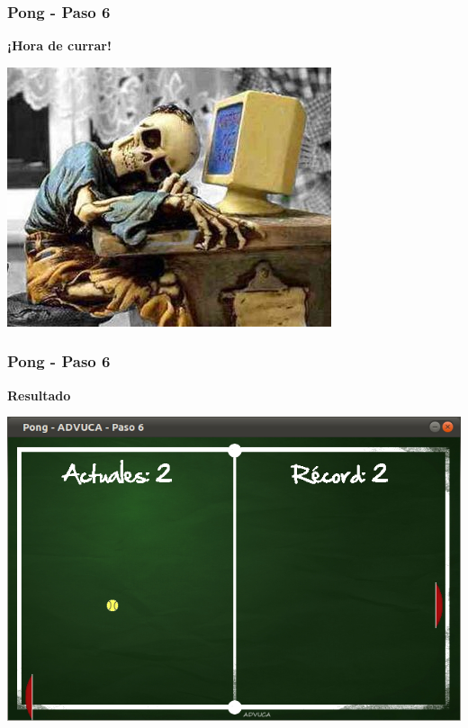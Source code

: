 \begin{frame}
	\frametitle{Pong - Paso 6}
	
    \begin{center}
        \textbf{¡Hora de currar!}
    \end{center}
	
    \begin{center}
		\includegraphics[scale=0.7]{img/currar-3.jpg}
	\end{center}	

\end{frame}

\begin{frame}
	\frametitle{Pong - Paso 6}
	
    \begin{center}
        \textbf{Resultado}
    \end{center}
	
    \begin{center}
		\includegraphics[scale=0.4]{img/pong-advuca-6.png}
	\end{center}	

\end{frame}

